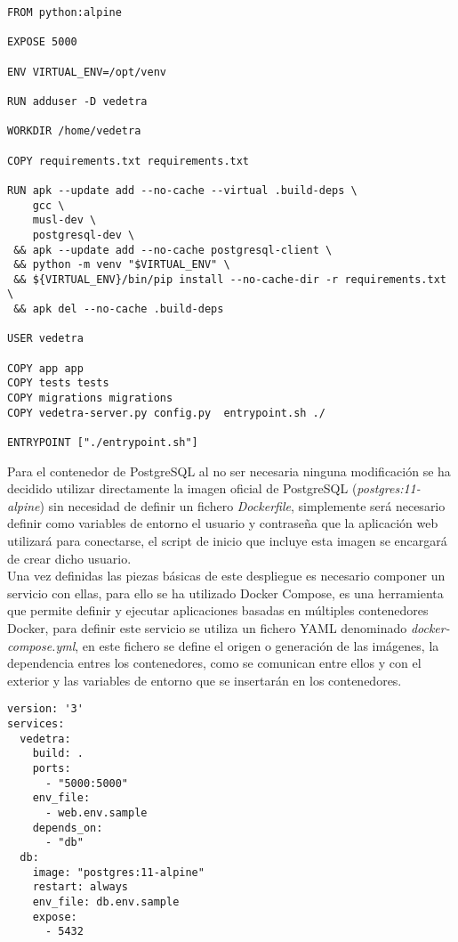 \documentclass[../proyecto.tex]{subfiles}
\begin{document}
\begin{minipage}{\linewidth}
\begin{lstlisting}[caption=Dockerfile del servidor web, captionpos=b, frame=single]
FROM python:alpine

EXPOSE 5000

ENV VIRTUAL_ENV=/opt/venv

RUN adduser -D vedetra

WORKDIR /home/vedetra

COPY requirements.txt requirements.txt

RUN apk --update add --no-cache --virtual .build-deps \
    gcc \
    musl-dev \
    postgresql-dev \
 && apk --update add --no-cache postgresql-client \
 && python -m venv "$VIRTUAL_ENV" \
 && ${VIRTUAL_ENV}/bin/pip install --no-cache-dir -r requirements.txt \
 && apk del --no-cache .build-deps

USER vedetra

COPY app app
COPY tests tests
COPY migrations migrations
COPY vedetra-server.py config.py  entrypoint.sh ./

ENTRYPOINT ["./entrypoint.sh"]
\end{lstlisting}
\end{minipage}

Para el contenedor de PostgreSQL al no ser necesaria ninguna modificación se ha decidido utilizar directamente la imagen oficial de PostgreSQL (\textit{postgres:11-alpine}) sin necesidad de definir un fichero \textit{Dockerfile}, simplemente será necesario definir como variables de entorno el usuario y contraseña que la aplicación web utilizará para conectarse, el script de inicio que incluye esta imagen se encargará de crear dicho usuario.\\

Una vez definidas las piezas básicas de este despliegue es necesario componer un servicio con ellas, para ello se ha utilizado Docker Compose, es una herramienta que permite definir y ejecutar aplicaciones basadas en múltiples contenedores Docker, para definir este servicio se utiliza un fichero YAML denominado \textit{docker-compose.yml}, en este fichero se define el origen o generación de las imágenes, la dependencia entres los contenedores, como se comunican entre ellos y con el exterior y las variables de entorno que se insertarán en los contenedores. \\

\begin{minipage}{\linewidth}
\begin{lstlisting}[caption=Fichero docker-compose.yml base, captionpos=b, frame=single]
version: '3'
services:
  vedetra:
    build: .
    ports:
      - "5000:5000"
    env_file:
      - web.env.sample
    depends_on:
      - "db"
  db:
    image: "postgres:11-alpine"
    restart: always
    env_file: db.env.sample
    expose:
      - 5432
\end{lstlisting}
\end{minipage}
\end{document}
